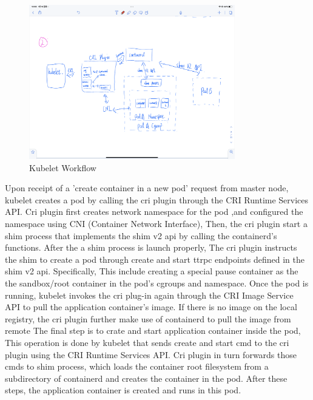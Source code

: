 \begin{figure}[H]
    \centering
    \includegraphics[width=0.8\textwidth]{images/IMG_4417.PNG}
    \caption[Kubelet Workflow]{Kubelet Workflow}
    \label{fig:Kubelet}
\end{figure}
Upon receipt of a ’create container in a new pod’ request from master node, kubelet  creates a pod by calling the cri plugin through the CRI Runtime Services API. 
Cri plugin first creates network namespace for the pod ,and configured the namespace using CNI (Container Network Interface), Then, the cri plugin start a shim process that implements the shim v2 api by calling the containerd's functions.
After the a shim process is launch properly, The cri plugin instructs the shim to create a pod through create and start ttrpc endpoints defined in the shim v2 api. Specifically, This include creating a special pause container as the the sandbox/root container in the pod's cgroups and namespace.
Once the pod is running, kubelet invokes the cri plug-in again through the CRI Image Service API to pull the application container's image. If there is no image on the local registry, the cri plugin further make use of containerd to pull the image from remote
The final step is to crate and start application container inside the pod,  This operation is done by kubelet that sends create and start cmd to the cri plugin  using the CRI Runtime Services API. Cri plugin in turn forwards those cmds to shim process, which
loads the container root filesystem from a subdirectory of containerd and creates the container in the pod. After these steps, the application container is created and runs in this pod.
